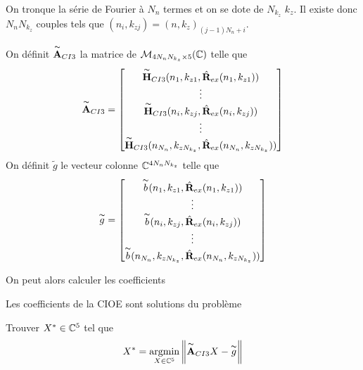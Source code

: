     On tronque la série de Fourier à \(N_{n}\) termes et on se dote de \(N_{k_z}\) \(k_z\). Il existe donc \(N_{n}N_{k_z}\) couples tels que \((n_i,k_{zj}) = (n,k_z)_{(j-1)N_{n}+i}\).
    \begin{defn}
      On définit \(\overset{\thicksim}{\mathbf{A}}_{CI3}\) la matrice de \(\mathcal{M}_{4N_{n}N_{k_z}\times5}(\mathbb C)\) telle que
      \begin{equation*}
        \overset{\thicksim}{\mathbf{A}}_{CI3} = 
        \begin{bmatrix}
          \overset{\thicksim}{\mathbf{H}}_{CI3}(n_1,k_{z1},\hat{\mathbf{R}}_{ex}(n_1,k_{z1}))
          \\
          \vdots
          \\
          \overset{\thicksim}{\mathbf{H}}_{CI3}(n_i,k_{zj},\hat{\mathbf{R}}_{ex}(n_i,k_{zj}))
          \\
          \vdots
          \\
          \overset{\thicksim}{\mathbf{H}}_{CI3}(n_{N_n},k_{zN_{k_z}},\hat{\mathbf{R}}_{ex}(n_{N_n},k_{zN_{k_z}}))
        \end{bmatrix}
      \end{equation*}
      On définit \(\tilde{g}\) le vecteur colonne \(\mathbb C^{4N_{n}N_{k_z}}\) telle que
      \begin{equation*}
        \overset{\thicksim}{g} = 
        \begin{bmatrix}
          \overset{\thicksim}{b}(n_1,k_{z1},\hat{\mathbf{R}}_{ex}(n_1,k_{z1}))
          \\
          \vdots
          \\
          \overset{\thicksim}{b}(n_i,k_{zj},\hat{\mathbf{R}}_{ex}(n_i,k_{zj}))
          \\
          \vdots
          \\
          \overset{\thicksim}{b}(n_{N_n},k_{zN_{k_z}},\hat{\mathbf{R}}_{ex}(n_{N_n},k_{zN_{k_z}}))
        \end{bmatrix}
      \end{equation*}
    \end{defn}

    On peut alors calculer les coefficients

    \begin{thm}

      Les coefficients de la CIOE sont solutions du problème

      Trouver \(X^* \in \mathbb C^5\) tel que
      \begin{equation*}
        X^* = {\underset{X\in \mathbb C^5}{\operatorname{argmin}}} \left\lVert\overset{\thicksim}{\mathbf{A}}_{CI3}X - \overset{\thicksim}{g}\right\rVert
      \end{equation*}
    \end{thm}

